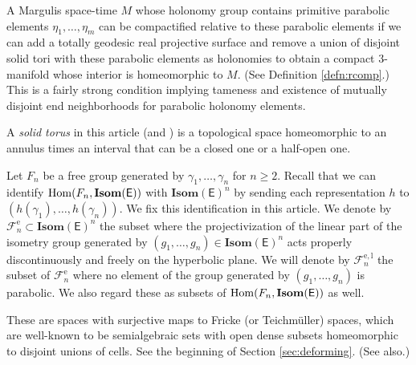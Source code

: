 \documentclass{amsart}
\numberwithin{equation}{section}
\newcommand\Hom{{\rm Hom}}
\newcommand\Isom{{\mathbf{Isom}}}
\newcommand\SO{{\mathsf{SO}}}
\newcommand\Lspace{\mathsf E}
\theoremstyle{definition}
\theoremstyle{remark}
\newcommand{\rome}{\mathrm e}
\newcommand{\romel}{{\mathrm{e}, \mathrm{l}}}
\begin{document}


A Margulis space-time $M$ whose holonomy group contains primitive 
parabolic elements  $\eta_1, \dots, \eta_m$ can be compactified relative to these parabolic elements if we can add a totally geodesic real projective surface
and remove a union of disjoint solid tori with these parabolic elements as holonomies to obtain a compact $3$-manifold whose interior is homeomorphic to $M$.
(See Definition \ref{defn:rcomp}.) This is a fairly strong condition implying tameness
and existence of mutually disjoint end neighborhoods for parabolic holonomy elements. 

A {\em solid torus} in this article (and \cite{CDG22})
is a topological space homeomorphic 
to an annulus times an interval that can be a closed one or a 
half-open one. 

Let $F_n$ be a free group generated by $\gamma_1, \dots, \gamma_n$ 
for $n \geq 2$. 
Recall that we can identify $\Hom(F_n, \Isom(\Lspace))$ with 
$\Isom(\Lspace)^n$ by sending each representation $h$ to 
$(h(\gamma_1), \dots, h(\gamma_n))$.  We fix this identification in this article.
We denote by
$\mathcal{F}^{\rome}_n\subset \Isom(\Lspace)^n$ the subset 
where the projectivization of the linear part of the isometry group generated by 
$(g_1, \dots, g_n) \in \Isom(\Lspace)^n$
acts properly discontinuously 
and freely on the hyperbolic plane. 
We will denote by $\mathcal{F}^{\romel}_n$ the subset of $\mathcal{F}^{\rome}_n$ 
where no element of the group generated by 
$(g_1, \dots, g_n)$ is parabolic. We also regard these as
subsets of $\Hom(F_n, \Isom(\Lspace))$ as well. 

These are spaces with surjective maps to Fricke (or Teichm\"uller) spaces,  
which are well-known to be semialgebraic sets with open dense subsets 
homeomorphic to disjoint unions of cells. See
the beginning of Section \ref{sec:deforming}.
(See \cite{G09} also.) 
\end{document}
